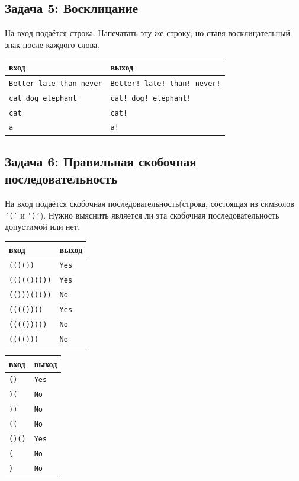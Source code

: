 \documentclass{article}
\begin{document}
\subsection*{Задача 5: Восклицание}
На вход подаётся строка. Напечатать эту же строку, но ставя восклицательный знак после каждого слова.
\begin{center}
\begin{tabular}{ l | l }
 вход & выход \\ \hline
 \texttt{Better late than never} & \texttt{Better! late! than! never!} \\
 \texttt{cat \quad dog elephant} & \texttt{cat! \quad dog! elephant!}  \\ 
 \texttt{cat} & \texttt{cat!} \\
 \texttt{a} & \texttt{a!} \\
\end{tabular}
\end{center}

\subsection*{Задача 6: Правильная скобочная последовательность}
На вход подаётся скобочная последовательность(строка, состоящая из символов \texttt{'('} и \texttt{')'}). Нужно выяснить является ли эта скобочная последовательность допустимой или нет.
\begin{multicols}{2}
\begin{center}
\begin{tabular}{ l | l }
 вход & выход \\ \hline
 \texttt{(()())} & \texttt{Yes} \\
 \texttt{(()(()()))} & \texttt{Yes} \\
 \texttt{(()))()())} & \texttt{No} \\
 \texttt{(((())))} & \texttt{Yes} \\
 \texttt{(((()))))} & \texttt{No} \\
 \texttt{(((()))} & \texttt{No} \\
\end{tabular}
\end{center}

\begin{center}
\begin{tabular}{ l | l }
 вход & выход \\ \hline
 \texttt{()} & \texttt{Yes} \\
 \texttt{)(} & \texttt{No} \\
 \texttt{))} & \texttt{No} \\
 \texttt{((} & \texttt{No} \\
 \texttt{()()} & \texttt{Yes} \\
 \texttt{(} & \texttt{No} \\
 \texttt{)} & \texttt{No} \\
\end{tabular}
\end{center}
\end{multicols}
\end{document}
